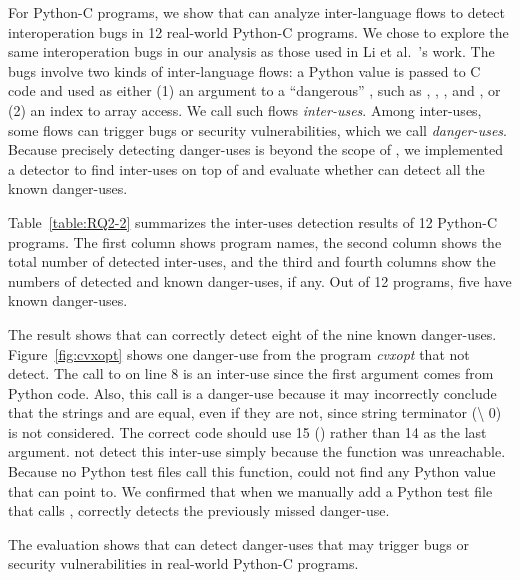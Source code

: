 For Python-C programs, we show that \ours can analyze inter-language flows to
detect interoperation bugs in 12 real-world Python-C programs.  We chose to
explore the same interoperation bugs in our analysis as those used in Li et
al.~\cite{polycruise}'s work.  The bugs involve two kinds of inter-language
flows: a Python value is passed to C code and used as either (1) an argument to
a ``dangerous'' , such as , ,
, and , or (2) an index to array access.  We call
such flows \textit{inter-uses}.  Among inter-uses, some flows can trigger bugs
or security vulnerabilities, which we call \textit{danger-uses}.  Because
precisely detecting danger-uses is beyond the scope of \ours, we implemented a
detector to find inter-uses on top of \ours and evaluate whether \ours can
detect all the known danger-uses.

Table~\ref{table:RQ2-2} summarizes the inter-uses detection results of 12
Python-C programs.  The first column shows program names, the second column
shows the total number of detected inter-uses, and the third and fourth columns
show the numbers of detected and known danger-uses, if any.  Out of 12
programs, five have known danger-uses.

The result shows that \ours can correctly detect eight of the nine known
danger-uses.  Figure~\ref{fig:cvxopt} shows one danger-use from the program
{\it cvxopt} that \ours {} not detect.  The call to  on line
8 is an inter-use since the first argument  comes from Python
code.  Also, this call is a danger-use because it may incorrectly conclude that
the strings  and  are equal, even if they
are not, since string terminator (\textquotesingle \textbackslash
0\textquotesingle) is not considered.  The correct code should use 15
() rather than 14 as the last argument.
\ours {} not detect this inter-use simply because the function
 was unreachable.  Because no Python test files call this
function, \ours could not find any Python value that  can point
to. We confirmed that when we manually add a Python test file that calls
, \ours correctly detects the previously missed danger-use.

The evaluation shows that \ours can detect danger-uses that may
trigger bugs or security vulnerabilities in real-world Python-C programs.
